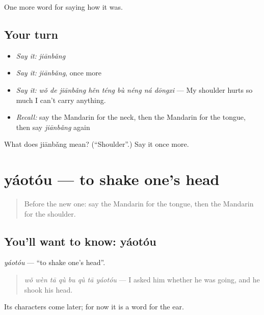 \begin{grammarlens}[title={What you've built}]
One more word for saying how it was.
\end{grammarlens}

\subsection*{Your turn}
\begin{itemize}
\raggedright
  \item \emph{Say it:} \emph{jiānbǎng}
  \item \emph{Say it:} \emph{jiānbǎng}, once more
  \item \emph{Say it:} \emph{wǒ de jiānbǎng hěn téng bù néng ná dōngxi} — My shoulder hurts so much I can't carry anything.
  \item \emph{Recall:} say the Mandarin for the neck, then the Mandarin for the tongue, then say \emph{jiānbǎng} again
\end{itemize}

\begin{tcolorbox}[breakable,colback=teal!4,colframe=teal!35!black,title={Before you move on}]
What does jiānbǎng mean? (\textquotedblleft{}Shoulder\textquotedblright{}.) Say it once more.
\end{tcolorbox}
\section[yáotóu]{yáotóu — to shake one's head}

\label{lesson:ZH-C476-yaotou}



\begin{quote}
Before the new one: say the Mandarin for the tongue, then the Mandarin for the shoulder.
\end{quote}

\subsection*{You'll want to know: yáotóu}
\emph{yáotóu} — \textquotedblleft{}to shake one's head\textquotedblright{}.

\begin{quote}
\emph{wǒ wèn tā qù bu qù tā yáotóu} — I asked him whether he was going, and he shook his head.
\end{quote}

Its characters come later; for now it is a word for the ear.

